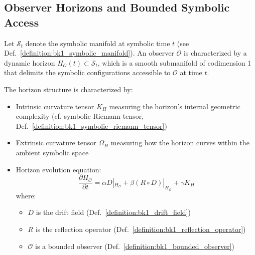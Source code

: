 \subsection{Observer Horizons and Bounded Symbolic Access}
\label{subsec:bk1_observer_horizons_bounded_access}

\begin{definition}
\label{definition:bk1_observer_horizon_structure}
Let $\mathcal{S}_t$ denote the symbolic manifold at symbolic time $t$ (see Def.~\ref{definition:bk1_symbolic_manifold}). An observer $\mathcal{O}$ is characterized by a dynamic horizon $H_\mathcal{O}(t) \subset \mathcal{S}_t$, which is a smooth submanifold of codimension 1 that delimits the symbolic configurations accessible to $\mathcal{O}$ at time $t$.

The horizon structure is characterized by:
\begin{itemize}
    \item Intrinsic curvature tensor $K_H$ measuring the horizon's internal geometric complexity (cf. symbolic Riemann tensor, Def.~\ref{definition:bk1_symbolic_riemann_tensor})
    \item Extrinsic curvature tensor $\Omega_H$ measuring how the horizon curves within the ambient symbolic space
    \item Horizon evolution equation:
    \[
    \frac{\partial H_\mathcal{O}}{\partial t} = \alpha D|_{H_\mathcal{O}} + \beta (R \circ D)|_{H_\mathcal{O}} + \gamma K_H
    \]
    where:
    \begin{itemize}
        \item \( D \) is the drift field (Def.~\ref{definition:bk1_drift_field})
        \item \( R \) is the reflection operator (Def.~\ref{definition:bk1_reflection_operator})
        \item \( \mathcal{O} \) is a bounded observer (Def.~\ref{definition:bk1_bounded_observer})
    \end{itemize}
\end{itemize}
\end{definition}

